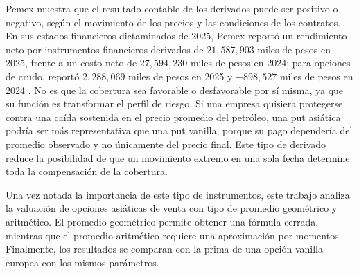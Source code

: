 \documentclass[11pt,letterpaper]{article}
\begin{document}
Pemex muestra que el resultado contable de los derivados puede ser positivo o negativo, según el movimiento de los precios y las condiciones de los contratos. En sus estados financieros dictaminados de 2025, Pemex reportó un rendimiento neto por instrumentos financieros derivados de \(21{,}587{,}903\) miles de pesos en 2025, frente a un costo neto de \(27{,}594{,}230\) miles de pesos en 2024; para opciones de crudo, reportó \(2{,}288{,}069\) miles de pesos en 2025 y \(-898{,}527\) miles de pesos en 2024 \citep{pemex2025estados}. No es que la cobertura sea favorable o desfavorable por sí misma, ya que su función es transformar el perfil de riesgo. Si una empresa quisiera protegerse contra una caída sostenida en el precio promedio del petróleo, una put asiática podría ser más representativa que una put vanilla, porque su pago dependería del promedio observado y no únicamente del precio final. Este tipo de derivado reduce la posibilidad de que un movimiento extremo en una sola fecha determine toda la compensación de la cobertura.

Una vez notada la importancia de este tipo de instrumentos, este trabajo analiza la valuación de opciones asiáticas de venta con tipo de promedio geométrico y aritmético. El promedio geométrico permite obtener una fórmula cerrada, mientras que el promedio aritmético requiere una aproximación por momentos. Finalmente, los resultados se comparan con la prima de una opción vanilla europea con los mismos parámetros.






\end{document}
